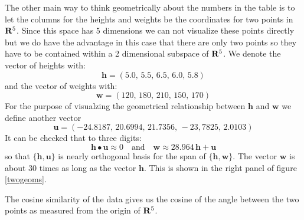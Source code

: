    The other main way to think geometrically about the numbers in the table is 
to let the columns for the heights and weights be the coordinates for two 
points in ${\bf R}^5$.  Since this space has 5 dimensions we can not visualize 
these points directly but we do have the advantage in this case that there are 
only two points so they have to be contained within a 2 dimensional subspace
of ${\bf R}^5$.  We denote the vector of heights with:
\begin{equation*}
\mathbf{h} = (5.0,\, 5.5,\, 6.5,\, 6.0,\, 5.8)
\end{equation*}
and the vector of weights with:
\begin{equation*}
\mathbf{w} = (120,\, 180,\, 210,\, 150,\, 170)
\end{equation*}
For the purpose of visualzing the geometrical relationship between 
$\mathbf{h}$ and $\mathbf{w}$ we define another vector
\begin{equation*}
\mathbf{u} = (-24.8187,\, 20.6994,\, 21.7356,\, -23,7825,\, 2.0103)
\end{equation*}
It can be checked that to three digits:
\begin{equation*}
\mathbf{h} \bullet \mathbf{u} \approx 0 \quad \mbox{and} \quad
\mathbf{w} \approx 28.964 \, \mathbf{h} + \mathbf{u}
\end{equation*}
so that $\{ \mathbf{h}, \mathbf{u} \}$ is nearly orthogonal basis for the span
of $\{ \mathbf{h}, \mathbf{w} \}$.  The vector $\mathbf{w}$ is about $30$ 
times as long as the vector $\mathbf{h}$.  This is shown in the right panel of
figure \ref{twogeoms}.

The cosine similarity of the data gives us the cosine of the angle between the two points 
as measured from the origin of ${\bf R}^5$.

